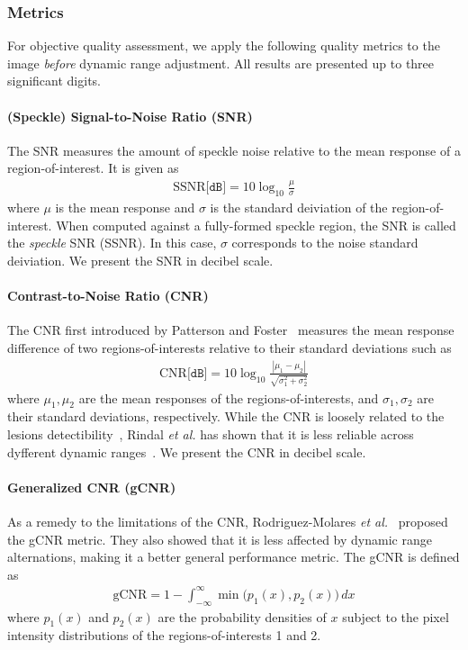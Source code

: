 \subsubsection{Metrics}
For objective quality assessment, we apply the following quality metrics to the image \textit{before} dynamic range adjustment.
All results are presented up to three significant digits.

\paragraph{(Speckle) Signal-to-Noise Ratio (SNR)}
The SNR measures the amount of speckle noise relative to the mean response of a region-of-interest.
It is given as
\begin{align}
  \mathrm{SSNR} \texttt{[dB]} = 10 \log_{10} \frac{\mu}{\sigma}
\end{align}
where \(\mu\) is the mean response and \(\sigma\) is the standard deiviation of the region-of-interest.
When computed against a fully-formed speckle region, the SNR is called the \textit{speckle} SNR (SSNR).
In this case, \(\sigma\) corresponds to the noise standard deiviation.
We present the SNR in decibel scale.

\paragraph{Contrast-to-Noise Ratio (CNR)}
The CNR first introduced by Patterson and Foster~\cite{patterson_improvement_1983} measures the mean response difference of two regions-of-interests relative to their standard deviations such as
\begin{align}
  \mathrm{CNR} \texttt{[dB]} = 10 \log_{10} \frac{| \mu_{1} - \mu_{2} |}{ \sqrt{\sigma^2_1 + \sigma^2_2} }
\end{align}
where \(\mu_1, \mu_2\) are the mean responses of the regions-of-interests, and \(\sigma_1, \sigma_2\) are their standard deviations, respectively.
While the CNR is loosely related to the lesions detectibility~\cite{smith_ultrasound_1984}, Rindal \textit{et al.} has shown that it is less reliable across dyfferent dynamic ranges~\cite{rindal_effect_2019}.
We present the CNR in decibel scale.


\paragraph{Generalized CNR (gCNR)}
As a remedy to the limitations of the CNR, Rodriguez-Molares \textit{et al.}~\cite{rodriguez-molares_generalized_2020} proposed the gCNR metric.
They also showed that it is less affected by dynamic range alternations, making it a better general performance metric.
The gCNR is defined as
\begin{align}
  \text{gCNR} = 1 - \int_{-\infty}^{\infty} \min\big(p_1\left(x\right), p_2\left(x\right)\big) \, dx
\end{align}
where \(p_1\left(x\right)\) and \(p_2\left(x\right)\) are the probability densities of \(x\) subject to the pixel intensity distributions of the regions-of-interests 1 and 2.

